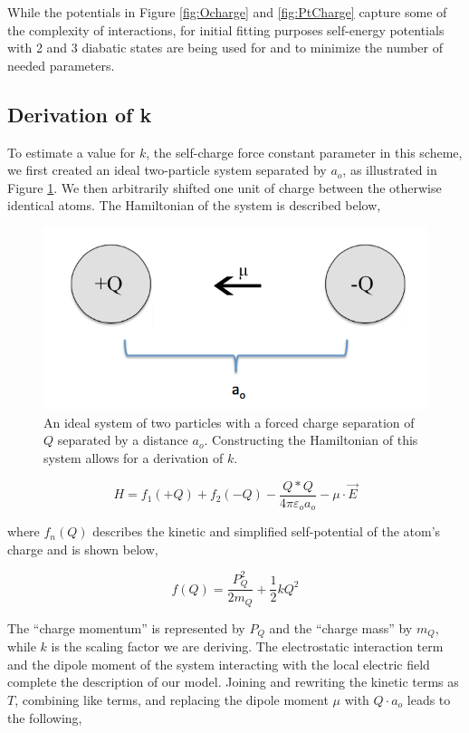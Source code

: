While the potentials in Figure \ref{fig:Ocharge} and \ref{fig:PtCharge} capture
some of the complexity of  interactions, for initial fitting
purposes self-energy potentials with 2 and 3 diabatic states are being used for
 and  to minimize the number of needed parameters.

\subsection{Derivation of k}
To estimate a value for $k$, the self-charge force constant parameter in this scheme, we first
created an ideal two-particle system separated by $a_o$, as illustrated in
Figure \ref{fig:kSketch}.  We then arbitrarily shifted one unit of charge
between the otherwise identical atoms. The Hamiltonian of the system is
described below,

\begin{figure}
  \centering
  \includegraphics[width=0.75\linewidth]{../figures/chap5/determineK2.png}
  \caption{An ideal system of two particles with a forced charge separation of
$Q$ separated by a distance $a_o$. Constructing the Hamiltonian of this system
allows for a derivation of $k$.}
\label{fig:kSketch}
\end{figure}

\begin{equation*}
H = f_1(+Q) + f_2(-Q) - \frac{Q*Q}{4\pi\varepsilon_o a_o} - \mu\cdot\vec{E}
\end{equation*}

where $f_n(Q)$ describes the kinetic and simplified self-potential of the
atom's charge and is shown below,

\begin{equation*}
f(Q) = \frac{P_Q^2}{2m_Q} + \frac{1}{2}kQ^2
\end{equation*}

The ``charge momentum'' is represented by $P_Q$ and the ``charge mass'' by $m_Q$, while
$k$ is the scaling factor we are deriving. The electrostatic interaction term
and the dipole moment of the system interacting with the local electric field
complete the description of our model. Joining and rewriting the kinetic terms as $T$,
combining like terms, and replacing the dipole moment $\mu$ with $Q\cdot a_o$ leads to the
following,

